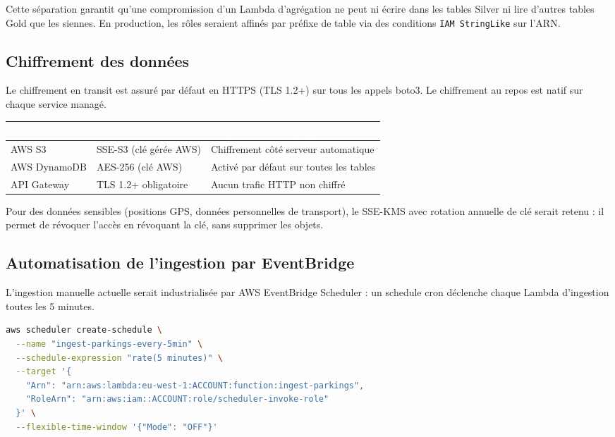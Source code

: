 \documentclass[11pt]{article}
\newcommand{\thead}[1]{\textbf{\textcolor{white}{#1}}}
\begin{document}
Cette séparation garantit qu'une compromission d'un Lambda d'agrégation ne peut ni
écrire dans les tables Silver ni lire d'autres tables Gold que les siennes. En
production, les rôles seraient affinés par préfixe de table via des conditions
\texttt{IAM StringLike} sur l'ARN.

\subsection{Chiffrement des données}

Le chiffrement en transit est assuré par défaut en HTTPS (TLS 1.2+) sur tous les
appels boto3. Le chiffrement au repos est natif sur chaque service managé.

\begin{center}\begin{tabularx}{\linewidth}{|l|l|>{\raggedright\arraybackslash}X|}
\hline
\rowcolor{tableHeader}
\thead{Service} & \thead{Mode de chiffrement} & \thead{Implémentation projet} \\
\hline
AWS S3 & SSE-S3 (clé gérée AWS) & Chiffrement côté serveur automatique \\
\hline
AWS DynamoDB & AES-256 (clé AWS) & Activé par défaut sur toutes les tables \\
\hline
API Gateway & TLS 1.2+ obligatoire & Aucun trafic HTTP non chiffré \\
\hline
\end{tabularx}\end{center}

Pour des données sensibles (positions GPS, données personnelles de transport), le
SSE-KMS avec rotation annuelle de clé serait retenu : il permet de révoquer l'accès
en révoquant la clé, sans supprimer les objets.

\subsection{Automatisation de l'ingestion par EventBridge}

L'ingestion manuelle actuelle serait industrialisée par AWS EventBridge Scheduler :
un schedule cron déclenche chaque Lambda d'ingestion toutes les 5 minutes.

\begin{lstlisting}[language=bash, caption=EventBridge Scheduler -- déclenchement périodique (AWS CLI)]
aws scheduler create-schedule \
  --name "ingest-parkings-every-5min" \
  --schedule-expression "rate(5 minutes)" \
  --target '{
    "Arn": "arn:aws:lambda:eu-west-1:ACCOUNT:function:ingest-parkings",
    "RoleArn": "arn:aws:iam::ACCOUNT:role/scheduler-invoke-role"
  }' \
  --flexible-time-window '{"Mode": "OFF"}'
\end{lstlisting}
\end{document}
